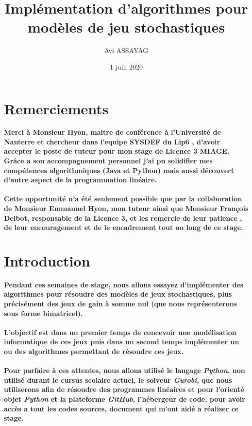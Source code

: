 \documentclass[a4paper, 12pt, twoside]{article}
\author{Avi ASSAYAG}
\title{Implémentation d'algorithmes pour modèles de jeu stochastiques }
\date{1 juin 2020}
\begin{document}
\pagedegarde


\section*{Remerciements}
\paragraph{Merci à Monsieur Hyon, maitre de conférence à l'Université de Nanterre et chercheur dans l'equipe SYSDEF du Lip6 , d'avoir accepter le poste de tuteur pour mon stage de Licence 3 MIAGE. Grâce a son accompagnement personnel j'ai pu solidifier mes compétences algorithmiques (Java et Python) mais aussi découvert d'autre aspect de la programmation linéaire. }

\paragraph{Cette opportunité n'a été seulement possible que par la collaboration de Monsieur Emmanuel Hyon, mon tuteur ainsi que Monsieur François Delbot, responsable de la Licence 3, et les remercie de leur patience , de leur encouragement et de le encadrement tout au long de ce stage. }
\newpage

\tableofcontents
\newpage

\section{Introduction}
\paragraph{Pendant ces semaines de stage, nous allons essayez d'implémenter des algorithmes pour résoudre des modèles de jeux stochastiques, plus précisément des jeux  de gain à somme nul (que nous représenterons sous forme bimatricel).} 
\paragraph{L'objectif est dans un premier temps de concevoir une modélisation informatique de ces jeux puis dans un second temps implémenter un ou des algorithmes permettant de résoudre ces jeux.}
\paragraph{Pour parfaire à ces attentes, nous allons utilisé le langage \textit{Python}, non utilisé durant le cursus scolaire actuel, le solveur \textit{Gurobi}, que nous utiliserons afin de résoudre des programmes linéaires et pour l'orienté objet \textit{Python} et la plateforme \textit{GitHub}, l'hébergeur de code, pour avoir accès a tout les codes sources, document qui m'ont aidé a réaliser ce stage.}
\end{document}
